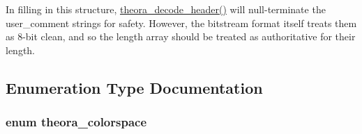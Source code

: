 In filling in this structure, \hyperlink{group__oldfuncs_ga02915e63c1bd733ee291f577a8b75a82}{theora\+\_\+decode\+\_\+header()} will null-\/terminate the user\+\_\+comment strings for safety. However, the bitstream format itself treats them as 8-\/bit clean, and so the length array should be treated as authoritative for their length. 

\subsection{Enumeration Type Documentation}
\hypertarget{group__oldfuncs_gaa567da4ce591f7373149ce3ef3acdac9}{
\subsubsection[{theora\+\_\+colorspace}]{\setlength{\rightskip}{0pt plus 5cm}enum {\bf theora\+\_\+colorspace}}}\label{group__oldfuncs_gaa567da4ce591f7373149ce3ef3acdac9}
